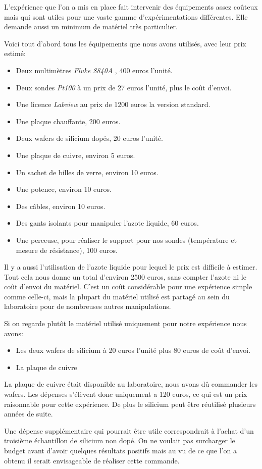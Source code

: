 L'expérience que l'on a mis en place fait intervenir des équipements assez coûteux mais qui sont utiles pour une vaste gamme d'expérimentations différentes. Elle demande aussi un minimum de matériel très particulier.

\bigskip
Voici tout d'abord tous les équipements que nous avons utilisés, avec leur prix estimé:

\begin{itemize}
  \item Deux multimètres \emph{Fluke 8840A} , 400 euros l'unité.
  \item Deux sondes \emph{Pt100} à un prix de 27 euros l'unité, plus le coût d'envoi.
  \item Une licence \emph{Labview} au prix de 1200 euros la version standard.
  \item Une plaque chauffante, 200 euros.
  \item Deux wafers de silicium dopés, 20 euros l'unité.
  \item Une plaque de cuivre, environ 5 euros.
  \item Un sachet de billes de verre, environ 10 euros.
  \item Une potence, environ 10 euros. 
  \item Des câbles, environ 10 euros.
  \item Des gants isolants pour manipuler l'azote liquide, 60 euros.
  \item Une perceuse, pour réaliser le support pour nos sondes (température et mesure de résistance), 100 euros.
\end{itemize}

\bigskip
Il y a aussi l'utilisation de l'azote liquide pour lequel le prix est difficile à estimer. 
Tout cela nous donne un total d'environ 2500 euros, sans compter l'azote ni le coût d'envoi du matériel.
C'est un coût considérable pour une expérience simple comme celle-ci, mais la plupart du matériel utilisé est partagé au sein du laboratoire pour de nombreuses autres manipulations.

\bigskip
Si on regarde plutôt le matériel utilisé uniquement pour notre expérience nous avons:

\begin{itemize}
  \item Les deux wafers de silicium à 20 euros l'unité plus 80 euros de coût d'envoi.
  \item La plaque de cuivre
\end{itemize}

La plaque de cuivre était disponible au laboratoire, nous avons dû commander les wafers. Les dépenses s'élèvent donc uniquement a 120 euros, ce qui est un prix raisonnable pour cette expérience. De plus le silicium peut être réutilisé plusieurs années de suite. 

\bigskip
Une dépense supplémentaire qui pourrait être utile correspondrait à l'achat d'un troisième échantillon de silicium non dopé. On ne voulait pas surcharger le budget avant d'avoir quelques résultats positifs mais au vu de ce que l'on a obtenu il serait envisageable de réaliser cette commande.
